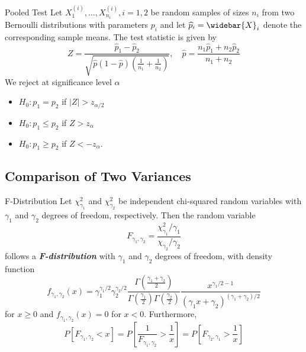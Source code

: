 \documentclass{beamer}
\newcommand{\bb}[1]{\textcolor{antiquefuchsia}{\textbf{\textit{#1}}}}
\begin{document}
\begin{frame}{Pooled Test}
Let $X_{1}^{(i)}, \ldots, X_{n_{i}}^{(i)}, i=1,2$ be random samples of sizes $n_{i}$ from two Bernoulli distributions with parameters $p_{i}$ and let $\widehat{p}_{i}=\widebar{X}_{i}$ denote the corresponding sample means. The test statistic is given by
$$
Z=\frac{\widehat{p}_{1}-\widehat{p}_{2}}{\sqrt{\widehat{p}(1-\widehat{p})\left(\frac{1}{n_{1}}+\frac{1}{n_{2}}\right)}}, \quad \widehat{p}=\frac{n_{1} \widehat{p}_{1}+n_{2} \widehat{p}_{2}}{n_{1}+n_{2}}
$$
We reject at significance level $\alpha$
\begin{itemize}
\item $H_{0}: p_{1}=p_{2}$ if $|Z|>z_{\alpha / 2}$
\item $H_{0}: p_{1} \leq p_{2}$ if $Z>z_{\alpha}$
\item $H_{0}: p_{1} \geq p_{2}$ if $Z<-z_{\alpha}$.
\end{itemize}
\end{frame}

\subsection{Comparison of Two Variances}
\begin{frame}{F-Distribution}
Let $\chi_{\gamma_{1}}^{2}$ and $\chi_{\gamma_{2}}^{2}$ be independent chi-squared random variables with $\gamma_{1}$ and $\gamma_{2}$ degrees of freedom, respectively. Then the random variable
$$
F_{\gamma_{1}, \gamma_{2}}=\frac{\chi_{\gamma_{1}}^{2} / \gamma_{1}}{\chi_{\gamma_{2}} / \gamma_{2}}
$$
follows a \bb{F-distribution} with $\gamma_{1}$ and $\gamma_{2}$ degrees of freedom, with density function
$$
f_{\gamma_{1}, \gamma_{2}}(x)=\gamma_{1}^{\gamma_{1} / 2} \gamma_{2}^{\gamma_{2} / 2} \frac{\Gamma\left(\frac{\gamma_{1}+\gamma_{2}}{2}\right)}{\Gamma\left(\frac{\gamma_{1}}{2}\right) \Gamma\left(\frac{\gamma_{2}}{2}\right)} \frac{x^{\gamma_{1} / 2-1}}{\left(\gamma_{1} x+\gamma_{2}\right)^{\left(\gamma_{1}+\gamma_{2}\right) / 2}}
$$
for $x \geq 0$ and $f_{\gamma_{1}, \gamma_{2}}(x)=0$ for $x<0$. Furthermore,
$$
P\left[F_{\gamma_{1}, \gamma_{2}}<x\right]=P\left[\frac{1}{F_{\gamma_{1}, \gamma_{2}}}>\frac{1}{x}\right]=P\left[F_{\gamma_{2}, \gamma_{1}}>\frac{1}{x}\right]
$$
\end{frame}
\end{document}
